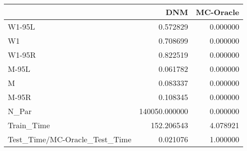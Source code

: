 \begin{tabular}{lrr}
\toprule
{} &            DNM &  MC-Oracle \\
\midrule
W1-95L                        &       0.572829 &   0.000000 \\
W1                            &       0.708699 &   0.000000 \\
W1-95R                        &       0.822519 &   0.000000 \\
M-95L                         &       0.061782 &   0.000000 \\
M                             &       0.083337 &   0.000000 \\
M-95R                         &       0.108345 &   0.000000 \\
N\_Par                         &  140050.000000 &   0.000000 \\
Train\_Time                    &     152.206543 &   4.078921 \\
Test\_Time/MC-Oracle\_Test\_Time &       0.021076 &   1.000000 \\
\bottomrule
\end{tabular}
